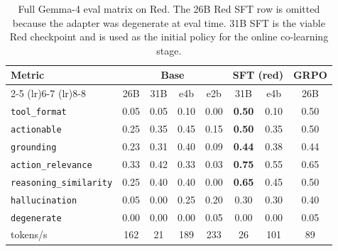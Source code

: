 \documentclass[11pt]{article}
\begin{document}
\begin{table}[t]
\centering
\scriptsize
\setlength{\tabcolsep}{3pt}
\caption{Full Gemma-4 eval matrix on Red. The 26B Red SFT row is omitted because the adapter was degenerate at eval time. 31B SFT is the viable Red checkpoint and is used as the initial policy for the online co-learning stage.}
\label{tab:h6_eval_full_red}
\begin{tabular}{lccccccc}
\toprule
Metric & \multicolumn{4}{c}{Base} & \multicolumn{2}{c}{SFT (red)} & GRPO \\
\cmidrule(lr){2-5} \cmidrule(lr){6-7} \cmidrule(lr){8-8}
       & 26B & 31B & e4b & e2b & 31B & e4b & 26B \\
\midrule
\texttt{tool\_format}          & 0.05 & 0.05 & 0.10 & 0.00 & \textbf{0.50} & 0.10 & 0.50 \\
\texttt{actionable}            & 0.25 & 0.35 & 0.45 & 0.15 & \textbf{0.50} & 0.35 & 0.50 \\
\texttt{grounding}             & 0.23 & 0.31 & 0.40 & 0.09 & \textbf{0.44} & 0.38 & 0.44 \\
\texttt{action\_relevance}     & 0.33 & 0.42 & 0.33 & 0.03 & \textbf{0.75} & 0.55 & 0.65 \\
\texttt{reasoning\_similarity} & 0.25 & 0.40 & 0.40 & 0.00 & \textbf{0.65} & 0.45 & 0.50 \\
\texttt{hallucination}         & 0.05 & 0.00 & 0.25 & 0.20 & 0.30 & 0.30 & 0.40 \\
\texttt{degenerate}            & 0.00 & 0.00 & 0.00 & 0.05 & 0.00 & 0.00 & 0.05 \\
tokens/s                       & 162 & 21 & 189 & 233 & 26 & 101 & 89 \\
\bottomrule
\end{tabular}
\end{table}
\end{document}
